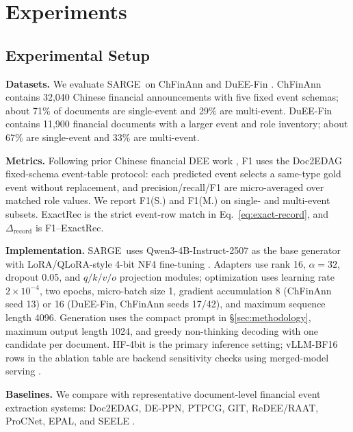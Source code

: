 \documentclass[runningheads]{llncs}
\newcommand{\method}{SARGE}
\begin{document}
\section{Experiments}
\label{sec:experiments}

\subsection{Experimental Setup}

\textbf{Datasets.} We evaluate \method\ on ChFinAnn and DuEE-Fin \cite{han2022dueefin,zheng2019doc2edag}. ChFinAnn contains 32,040 Chinese financial announcements with five fixed event schemas; about 71\% of documents are single-event and 29\% are multi-event. DuEE-Fin contains 11,900 financial documents with a larger event and role inventory; about 67\% are single-event and 33\% are multi-event.

\textbf{Metrics.} Following prior Chinese financial DEE work \cite{chen2025docfee,han2022dueefin,zheng2019doc2edag}, F1 uses the Doc2EDAG fixed-schema event-table protocol: each predicted event selects a same-type gold event without replacement, and precision/recall/F1 are micro-averaged over matched role values. We report F1(S.) and F1(M.) on single- and multi-event subsets. ExactRec is the strict event-row match in Eq.~\ref{eq:exact-record}, and $\Delta_{\mathrm{record}}$ is F1--ExactRec.

\textbf{Implementation.} \method\ uses Qwen3-4B-Instruct-2507 as the base generator \cite{qwen3technical} with LoRA/QLoRA-style 4-bit NF4 fine-tuning \cite{dettmers2023qlora,hu2022lora}. Adapters use rank 16, $\alpha=32$, dropout 0.05, and $q/k/v/o$ projection modules; optimization uses learning rate $2{\times}10^{-4}$, two epochs, micro-batch size 1, gradient accumulation 8 (ChFinAnn seed 13) or 16 (DuEE-Fin, ChFinAnn seeds 17/42), and maximum sequence length 4096. Generation uses the compact prompt in \S\ref{sec:methodology}, maximum output length 1024, and greedy non-thinking decoding with one candidate per document. HF-4bit is the primary inference setting; vLLM-BF16 rows in the ablation table are backend sensitivity checks using merged-model serving \cite{kwon2023vllm}.

\textbf{Baselines.} We compare with representative document-level financial event extraction systems: Doc2EDAG, DE-PPN, PTPCG, GIT, ReDEE/RAAT, ProCNet, EPAL, and SEELE \cite{hu2025epal,liang2022raat,wang2023procnet,xu2021git,xu2024seele,yang2021deppn,zheng2019doc2edag,zhu2022ptpcg}.
\end{document}
